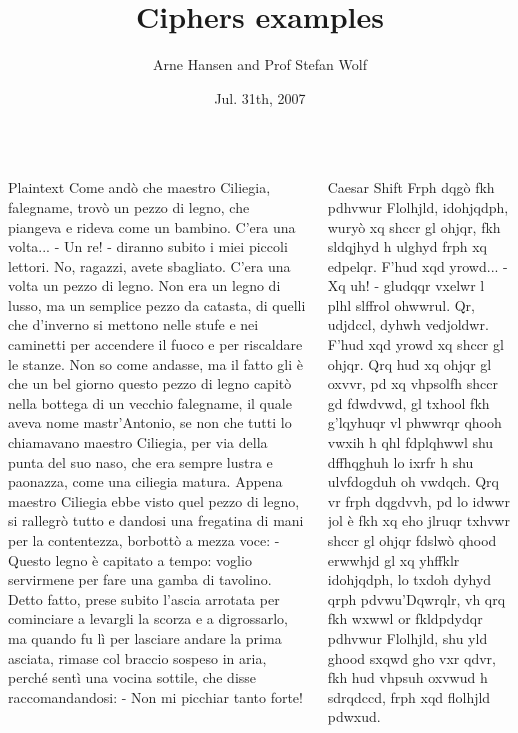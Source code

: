 \documentclass[final,hyperref={pdfpagelabels=false}]{beamer}
\title[Examples]{Ciphers examples}
\author[Hansen and Wolf]{Arne Hansen and Prof Stefan Wolf}
\institute[USI]{Cryptography and Quantum Information, USI Lugano}
\date{Jul. 31th, 2007}
\begin{document}
  \begin{frame}{} 
    \begin{columns}[t]
    \begin{column}{.1\linewidth}
      \begin{block}{Plaintext}
        Come andò che maestro Ciliegia, falegname, trovò un pezzo di legno, che piangeva e rideva come un bambino.
C'era una volta...
- Un re! - diranno subito i miei piccoli lettori.
No, ragazzi, avete sbagliato. C'era una volta un pezzo di legno.
Non era un legno di lusso, ma un semplice pezzo da catasta, di quelli che d'inverno si mettono nelle stufe e nei caminetti per accendere il fuoco e per riscaldare le stanze.
Non so come andasse, ma il fatto gli è che un bel giorno questo pezzo di legno capitò nella bottega di un vecchio falegname, il quale aveva nome mastr'Antonio, se non che tutti lo chiamavano maestro Ciliegia, per via della punta del suo naso, che era sempre lustra e paonazza, come una ciliegia matura.
Appena maestro Ciliegia ebbe visto quel pezzo di legno, si rallegrò tutto e dandosi una fregatina di mani per la contentezza, borbottò a mezza voce:
- Questo legno è capitato a tempo: voglio servirmene per fare una gamba di tavolino.
Detto fatto, prese subito l'ascia arrotata per cominciare a levargli la scorza e a digrossarlo, ma quando fu lì per lasciare andare la prima asciata, rimase col braccio sospeso in aria, perché sentì una vocina sottile, che disse raccomandandosi:
- Non mi picchiar tanto forte!
      \end{block}
    \end{column}
    \begin{column}{.1\linewidth}
        \begin{block}{Caesar Shift}
Frph dqgò fkh pdhvwur Flolhjld, idohjqdph, wuryò xq shccr gl ohjqr, fkh sldqjhyd h ulghyd frph xq edpelqr.
F'hud xqd yrowd...
- Xq uh! - gludqqr vxelwr l plhl slffrol ohwwrul.
Qr, udjdccl, dyhwh vedjoldwr. F'hud xqd yrowd xq shccr gl ohjqr.
Qrq hud xq ohjqr gl oxvvr, pd xq vhpsolfh shccr gd fdwdvwd, gl txhool fkh g'lqyhuqr vl phwwrqr qhooh vwxih h qhl fdplqhwwl shu dffhqghuh lo ixrfr h shu ulvfdogduh oh vwdqch.
Qrq vr frph dqgdvvh, pd lo idwwr jol è fkh xq eho jlruqr txhvwr shccr gl ohjqr fdslwò qhood erwwhjd gl xq yhffklr idohjqdph, lo txdoh dyhyd qrph pdvwu'Dqwrqlr, vh qrq fkh wxwwl or fkldpdydqr pdhvwur Flolhjld, shu yld ghood sxqwd gho vxr qdvr, fkh hud vhpsuh oxvwud h sdrqdccd, frph xqd flolhjld pdwxud.

\end{block}
\end{column}
\end{columns}
\end{frame}
\end{document}
